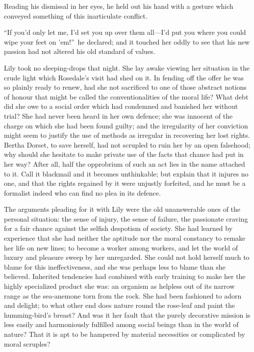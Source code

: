 \documentclass[12pt,a4paper]{book}
\begin{document}
Reading his dismissal in her eyes, he held out his hand with a
gesture which conveyed something of this inarticulate conflict.





``If you'd only let me, I'd set you up over them all---I'd put you
where you could wipe your feet on 'em!''\ he declared; and
it touched her oddly to see that his new passion had not altered
his old standard of values.







Lily took no sleeping-drops that night. She lay awake viewing her
situation in the crude light which Rosedale's visit had shed on
it. In fending off the offer he was so plainly ready to renew,
had she not sacrificed to one of those abstract notions of honour
that might be called the conventionalities of the moral life? 
What debt did she owe to a social order which had condemned and
banished her without trial? She had never been heard in her own
defence; she was innocent of the charge on which she had been
found guilty; and the irregularity of her conviction might seem
to justify the use of methods as irregular in recovering her lost
rights. Bertha Dorset, to save herself, had not scrupled to ruin
her by an open falsehood; why should she hesitate to make private
use of the facts that chance had put in her way? After all, half
the opprobrium of such an act lies in the name attached to it. 
Call it blackmail and it becomes unthinkable; but explain that it
injures no one, and that the rights regained by it were unjustly
forfeited, and he must be a formalist indeed who can find no plea
in its defence.





The arguments pleading for it with Lily were the old unanswerable
ones of the personal situation: the sense of injury, the sense of
failure, the passionate craving for a fair chance against the
selfish despotism of society. She had learned by experience that
she had neither the aptitude nor the moral constancy to remake
her life on new lines; to become a worker among workers, and let
the world of luxury and pleasure sweep by her unregarded. She
could not hold herself much to blame for this ineffectiveness,
and she was perhaps less to blame than she believed. Inherited
tendencies had combined with early training to make her the
highly specialized product she was: an organism as helpless out
of its narrow range as the sea-anemone torn from the rock. She
had been fashioned to adorn and delight; to what other end does
nature round the rose-leaf and paint the humming-bird's breast? 
And was it her fault that the purely decorative mission is less
easily and harmoniously fulfilled among social beings
than in the world of nature? That it is apt to be hampered by
material necessities or complicated by moral scruples?
\end{document}

